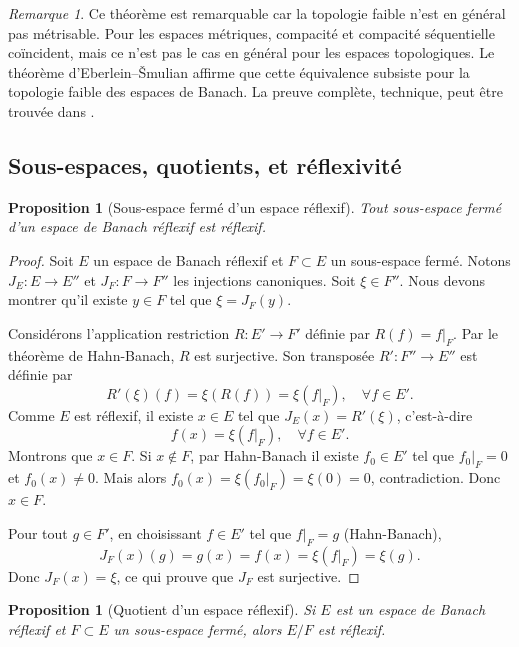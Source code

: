 \documentclass[a4paper,12pt]{book}
\theoremstyle{definition}
\theoremstyle{plain}
\newtheorem{proposition}[definition]{Proposition}
\theoremstyle{remark}
\newtheorem{remarque}[definition]{Remarque}
\begin{document}
\begin{remarque}
Ce théorème est remarquable car la topologie faible n'est en général pas métrisable.
Pour les espaces métriques, compacité et compacité séquentielle coïncident, mais
ce n'est pas le cas en général pour les espaces topologiques. Le théorème
d'Eberlein--\v{S}mulian affirme que cette équivalence subsiste pour la topologie
faible des espaces de Banach. La preuve complète, technique, peut être trouvée
dans \cite{Megginson1998}.
\end{remarque}

\subsection{Sous-espaces, quotients, et réflexivité}
\label{subsec:sous-espaces-quotients-reflexifs}

\begin{proposition}[Sous-espace fermé d'un espace réflexif]
\label{prop:sous-espace-reflexif}
Tout sous-espace fermé d'un espace de Banach réflexif est réflexif.
\end{proposition}

\begin{proof}
Soit $E$ un espace de Banach réflexif et $F \subset E$ un sous-espace fermé.
Notons $J_E : E \to E''$ et $J_F : F \to F''$ les injections canoniques.
Soit $\xi \in F''$. Nous devons montrer qu'il existe $y \in F$ tel que $\xi = J_F(y)$.

Considérons l'application restriction $R : E' \to F'$ définie par $R(f) = f|_F$.
Par le théorème de Hahn-Banach, $R$ est surjective. Son transposée
$R' : F'' \to E''$ est définie par
\[
  R'(\xi)(f) = \xi(R(f)) = \xi(f|_F), \quad \forall f \in E'.
\]
Comme $E$ est réflexif, il existe $x \in E$ tel que $J_E(x) = R'(\xi)$, c'est-à-dire
\[
  f(x) = \xi(f|_F), \quad \forall f \in E'.
\]
Montrons que $x \in F$. Si $x \notin F$, par Hahn-Banach il existe $f_0 \in E'$ tel que
$f_0|_F = 0$ et $f_0(x) \neq 0$. Mais alors
$f_0(x) = \xi(f_0|_F) = \xi(0) = 0$, contradiction. Donc $x \in F$.

Pour tout $g \in F'$, en choisissant $f \in E'$ tel que $f|_F = g$ (Hahn-Banach),
\[
  J_F(x)(g) = g(x) = f(x) = \xi(f|_F) = \xi(g).
\]
Donc $J_F(x) = \xi$, ce qui prouve que $J_F$ est surjective.
\end{proof}

\begin{proposition}[Quotient d'un espace réflexif]
\label{prop:quotient-reflexif}
Si $E$ est un espace de Banach réflexif et $F \subset E$ un sous-espace fermé,
alors $E/F$ est réflexif.
\end{proposition}
\end{document}
